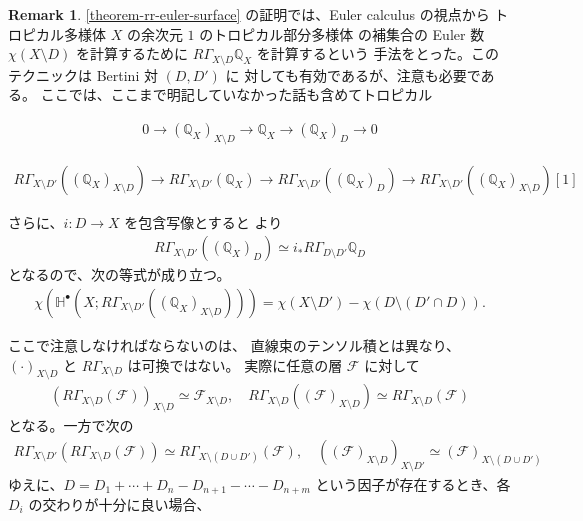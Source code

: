 \documentclass[a4paper,dvipdfmx,reqno,12pt]{amsart}
\theoremstyle{definition}
\newtheorem{remark}[theorem]{Remark}
\numberwithin{equation}{section}
\begin{document}
\begin{remark}

\cref{theorem-rr-euler-surface} 
の証明では、Euler calculus の視点から
トロピカル多様体 $X$ の余次元 $1$ のトロピカル部分多様体
の補集合の Euler 数 $\chi(X\setminus D)$ を計算するために
$R\Gamma_{X\setminus D}\mathbb{Q}_X$ を計算するという
手法をとった。このテクニックは Bertini 対 $(D,D')$ に
対しても有効であるが、注意も必要である。
ここでは、ここまで明記していなかった話も含めてトロピカル

\begin{align}
0 \to (\mathbb{Q}_X)_{X\setminus D}
\to \mathbb{Q}_X \to (\mathbb{Q}_X)_{D} \to 0
\end{align}


\begin{align}
R\Gamma_{X\setminus D'}((\mathbb{Q}_X)_{X\setminus D})
\to  R\Gamma_{X\setminus D'}(\mathbb{Q}_X)
\to R\Gamma_{X\setminus D'}((\mathbb{Q}_X)_D)
\to R\Gamma_{X\setminus D'}((\mathbb{Q}_X)_{X\setminus D})[1]
\end{align}

さらに、$i\colon D\to X$ を包含写像とすると
\cite[(2.3.20)]{MR1299726} より
\begin{align}
R\Gamma_{X\setminus D'}((\mathbb{Q}_X)_D)
\simeq i_* R\Gamma_{D\setminus D'}\mathbb{Q}_D
\end{align}
となるので、次の等式が成り立つ。
\begin{align}
\chi(\mathbb{H}^{\bullet}(X;R\Gamma_{X\setminus D'}((\mathbb{Q}_X)_{X\setminus D})))
= \chi(X\setminus D')
- \chi(D\setminus (D'\cap D)).
\end{align}

ここで注意しなければならないのは、
直線束のテンソル積とは異なり、
$(\cdot )_{X\setminus D}$
と $R\Gamma_{X\setminus D}$ は可換ではない。
実際に任意の層 $\mathcal{F}$ に対して
\begin{align}
(R\Gamma_{X\setminus D}(\mathcal{F}))_{X\setminus D}
\simeq 
\mathcal{F}_{X\setminus D}, \quad
R\Gamma_{X\setminus D}((\mathcal{F})_{X\setminus D})
\simeq R\Gamma_{X\setminus D}(\mathcal{F})
\end{align}
となる。一方で次の
\begin{align}
R\Gamma_{X\setminus D'}
(R\Gamma_{X\setminus D}(\mathcal{F}))
\simeq R\Gamma_{X\setminus (D\cup D')}(\mathcal{F}), \quad
((\mathcal{F})_{X\setminus D})_{X\setminus D'}
\simeq (\mathcal{F})_{X\setminus (D \cup D')}
\end{align}
ゆえに、$D=D_1+\cdots + D_n-D_{n+1}-\cdots-D_{n+m}$ 
という因子が存在するとき、各 $D_i$ 
の交わりが十分に良い場合、
\end{remark}
\end{document}
